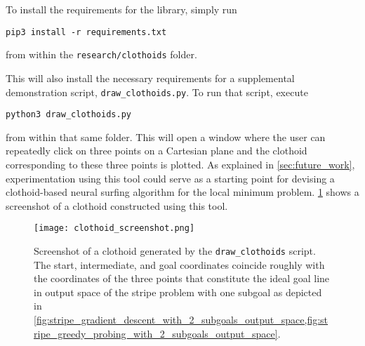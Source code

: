 To install the requirements for the library, simply run
\begin{verbatim}
pip3 install -r requirements.txt
\end{verbatim}
from within the \texttt{research/clothoids} folder.

This will also install the necessary requirements for a supplemental demonstration script, \texttt{draw\_clothoids.py}.
To run that script, execute 
\begin{verbatim}
python3 draw_clothoids.py
\end{verbatim}
from within that same folder.
This will open a window where the user can repeatedly click on three points on a Cartesian plane and the clothoid corresponding to these three points is plotted.
As explained in \ref{sec:future_work}, experimentation using this tool could serve as a starting point for devising a clothoid-based neural surfing algorithm for the local minimum problem.
\ref{fig:clothoid_screenshot} shows a screenshot of a clothoid constructed using this tool. 
\begin{figure}
  \centering
  \texttt{[image: clothoid\_screenshot.png]}
  \caption{Screenshot of a clothoid generated by the \texttt{draw\_clothoids} script. The start, intermediate, and goal coordinates coincide roughly with the coordinates of the three points that constitute the ideal goal line in output space of the stripe problem with one subgoal as depicted in \ref{fig:stripe_gradient_descent_with_2_subgoals_output_space,fig:stripe_greedy_probing_with_2_subgoals_output_space}.}
  \label{fig:clothoid_screenshot}
\end{figure}